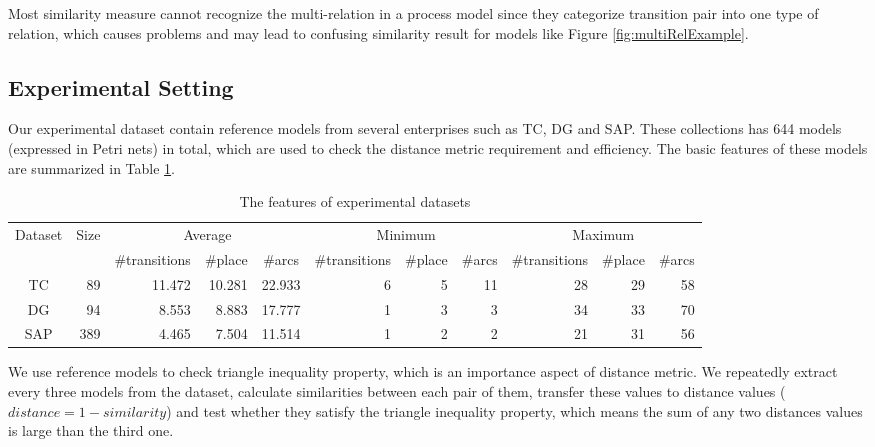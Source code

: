 \documentclass{llncs}
\begin{document}
Most similarity measure cannot recognize the multi-relation in a process model since they categorize transition pair into one type of relation, which causes problems and may lead to confusing similarity result for models like Figure \ref{fig:multiRelExample}.

\subsection{Experimental Setting}\label{subsec:setting}
Our experimental dataset contain reference models from several enterprises such as TC, DG and SAP. These collections has 644 models (expressed in Petri nets) in total, which are used to check the distance metric requirement and efficiency. The basic features of these models are summarized in Table \ref{tab:datasets}.

\begin{table}[htbp]
\centering
\caption{The features of experimental datasets\label{tab:datasets}}
\scriptsize
\begin{tabular}{|c|r|r|r|r|r|r|r|r|r|r|} \hline
	\multicolumn{1}{|c|}{\multirow{2}{*}{Dataset}} & \multicolumn{1}{c|}{\multirow{2}{*}{Size}} & \multicolumn{3}{|c}{Average} & \multicolumn{3}{|c}{Minimum} & \multicolumn{3}{|c|}{Maximum}\\ \cline{3-11}
	\multicolumn{1}{|c|}{} & \multicolumn{1}{c|}{} & \multicolumn{1}{c|}{\#transitions} & \multicolumn{1}{c|}{\#place} & \multicolumn{1}{c|}{\#arcs} & \multicolumn{1}{c|}{\#transitions} & \multicolumn{1}{c|}{\#place} & \multicolumn{1}{c|}{\#arcs} & \multicolumn{1}{c|}{\#transitions} & \multicolumn{1}{c|}{\#place} & \multicolumn{1}{c|}{\#arcs}\\ \hline
	TC & 89 & 11.472 & 10.281 & 22.933 & 6 & 5 & 11 & 28 & 29 & 58 \\ \hline
	DG & 94 & 8.553 & 8.883 & 17.777 & 1 & 3 & 3 & 34 & 33 & 70 \\ \hline
	SAP & 389 & 4.465 & 7.504 & 11.514 & 1 & 2 & 2 & 21 & 31 & 56 \\ \hline
\end{tabular}
\end{table}

We use reference models to check triangle inequality property, which is an importance aspect of distance metric. We repeatedly extract every three models from the dataset, calculate similarities between each pair of them, transfer these values to distance values ($distance=1-similarity$) and test whether they satisfy the triangle inequality property, which means the sum of any two distances values is large than the third one. 
\end{document}

